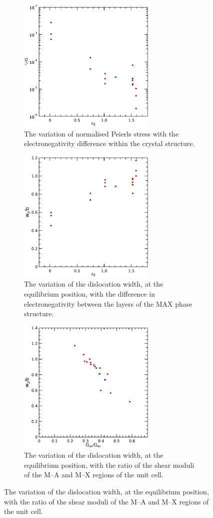 \begin{figure}
\centering
\begin{subfigure}{7.5cm}
\centering
\includegraphics[width=6.6cm]{tp_vs_dX}
\caption{The variation of normalised Peierls stress with the electronegativity difference within the crystal structure.\label{fig:tp_vs_dX}}
\end{subfigure}
\par\medskip
\begin{subfigure}{7.5cm}
\centering
\includegraphics[width=6.6cm]{w0_vs_dX}
\captionsetup{width=\textwidth}
\caption{The variation of the dislocation width, at the equilibrium position, with the difference in electronegativity between the layers of the MAX phase structure.\label{fig:w0_vs_dX}}
\end{subfigure}
\par\medskip
\begin{subfigure}{8cm}
\centering
\includegraphics[width=6.6cm]{w0_vs_Gma_upon_Gmx}
\caption{The variation of the dislocation width, at the equilibrium position, with the ratio of the shear moduli of the M--A and M--X regions of the unit cell. \label{fig:w0_vs_Gma_upon_Gmx}}
\end{subfigure}


\end{figure}
